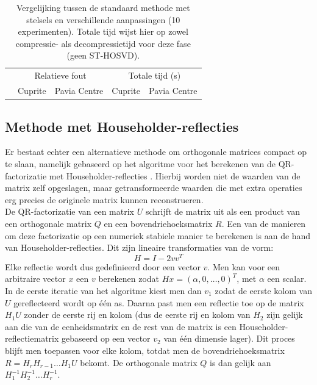 \begin{table}[H]
\centering
\begin{tabular}{|l|c|c|c|c|}
\hline
\multirow{2}{*}{} & \multicolumn{2}{c|}{Relatieve fout} & \multicolumn{2}{c|}{Totale tijd (s)} \\ \cline{2-5} 
 & Cuprite & Pavia Centre & Cuprite & Pavia Centre \\ \hline
                             
\end{tabular}
\caption{Vergelijking tussen de standaard methode met stelsels en verschillende aanpassingen (10 experimenten). Totale tijd wijst hier op zowel compressie- als decompressietijd voor deze fase (geen ST-HOSVD).}
\label{table:orthogonality-compression-systems-summary}
\end{table}

\newpage
\subsection{Methode met Householder-reflecties}

Er bestaat echter een alternatieve methode om orthogonale matrices compact op te slaan, namelijk gebaseerd op het algoritme voor het berekenen van de QR-factorizatie met Householder-reflecties \cite{ref:qr_factorization_householder}. Hierbij worden niet de waarden van de matrix zelf opgeslagen, maar getransformeerde waarden die met extra operaties erg precies de originele matrix kunnen reconstrueren.\\

De QR-factorizatie van een matrix $U$ schrijft de matrix uit als een product van een orthogonale matrix $Q$ en een bovendriehoeksmatrix $R$. Een van de manieren om deze factorizatie op een numeriek stabiele manier te berekenen is aan de hand van Householder-reflecties. Dit zijn lineaire transformaties van de vorm:
\[
H = I - 2vv^T
\]
Elke reflectie wordt dus gedefinieerd door een vector $v$. Men kan voor een arbitraire vector $x$ een $v$ berekenen zodat $Hx = (\alpha, 0, \dots, 0)^T$, met $\alpha$ een scalar. In de eerste iteratie van het algoritme kiest men dan $v_1$ zodat de eerste kolom van $U$ gereflecteerd wordt op \'e\'en as. Daarna past men een reflectie toe op de matrix $H_1 U$ zonder de eerste rij en kolom (dus de eerste rij en kolom van $H_2$ zijn gelijk aan die van de eenheidsmatrix en de rest van de matrix is een Householder-reflectiematrix gebaseerd op een vector $v_2$ van \'e\'en dimensie lager). Dit proces blijft men toepassen voor elke kolom, totdat men de bovendriehoeksmatrix $R = H_r H_{r-1} \dots H_1 U$ bekomt. De orthogonale matrix $Q$ is dan gelijk aan $H_1^{-1} H_2^{-1} \dots H_r^{-1}$.\\

